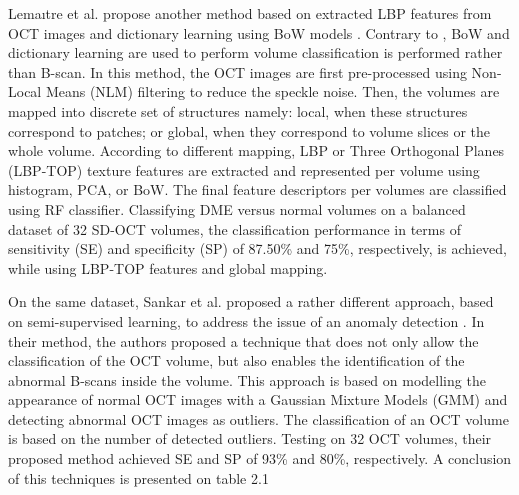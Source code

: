 Lemaıtre et al. propose another method based on extracted LBP features from OCT images and dictionary learning using BoW models \cite{lemaitre2015classification}. Contrary to \cite{srinivasan2014fully}, BoW and dictionary learning are used to perform volume classification is performed rather than B-scan. In this method, the OCT images are first pre-processed using Non-Local Means (NLM) filtering to reduce the speckle noise.
Then, the volumes are mapped into discrete set of structures namely: local, when these structures correspond to patches; or global, when they correspond to volume slices or the whole volume.
According to different mapping, LBP or Three Orthogonal Planes (LBP-TOP) texture features are extracted and represented per volume using histogram, PCA, or BoW.
The final feature descriptors per volumes are classified using RF classifier.
Classifying DME versus normal volumes on a balanced dataset of 32 SD-OCT volumes, the classification performance in terms of sensitivity (SE) and specificity (SP) of 87.50\% and 75\%, respectively, is achieved, while using LBP-TOP features and global mapping.

On the same dataset, Sankar et al. proposed a rather different approach, based on semi-supervised learning, to address the issue of an anomaly detection \cite{sankar2016classification}.
In their method, the authors proposed a technique that does not only allow the classification
of the OCT volume, but also enables the identification of the abnormal B-scans inside the volume.
This approach is based on modelling the appearance of normal OCT images with a Gaussian Mixture Models (GMM) and detecting abnormal OCT images as outliers.
The classification of an OCT volume is based on the number of detected outliers.
Testing on 32 OCT volumes, their proposed method achieved SE and SP of 93\% and 80\%, respectively.
A conclusion of this techniques is presented on table 2.1

